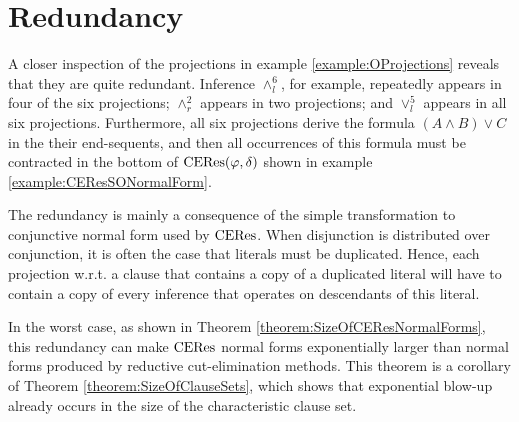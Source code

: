 \documentclass{llncs}
\begin{document}
\begin{landscape}
\end{landscape}


\section{Redundancy}
\label{sec:Redundancy}

A closer inspection of the projections in example \ref{example:OProjections} reveals that they are quite redundant. Inference $\wedge_l^6$, for example, repeatedly appears in four of the six projections; $\wedge_r^2$ appears in two projections; and $\vee_l^5$ appears in all six projections. Furthermore, all six projections derive the formula $(A \wedge B) \vee C$ in the their end-sequents, and then all occurrences of this formula must be contracted in the bottom of $\mathrm{CERes}(\varphi,\delta)$ shown in example \ref{example:CEResSONormalForm}. 

The redundancy is mainly a consequence of the simple transformation to conjunctive normal form used by $\mathrm{CERes}$. When disjunction is distributed over conjunction, it is often the case that literals must be duplicated. Hence, each projection w.r.t. a clause that contains a copy of a duplicated literal will have to contain a copy of every inference that operates on descendants of this literal.

In the worst case, as shown in Theorem \ref{theorem:SizeOfCEResNormalForms}, this redundancy can make $\mathrm{CERes}$ normal forms exponentially larger than normal forms produced by reductive cut-elimination methods. This theorem is a corollary of Theorem \ref{theorem:SizeOfClauseSets}, which shows that exponential blow-up already occurs in the size of the characteristic clause set.
\end{document}
